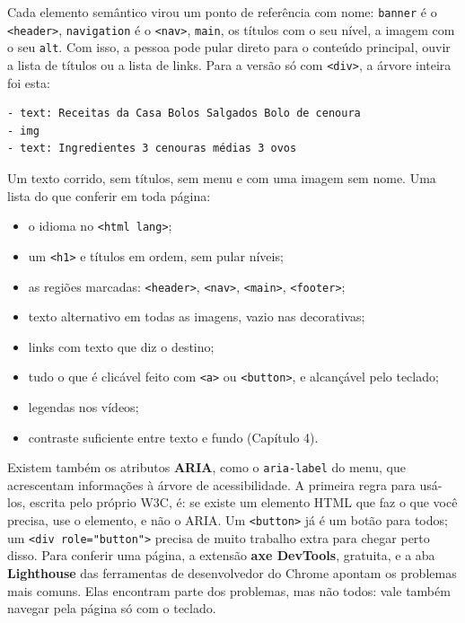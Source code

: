 Cada elemento semântico virou um ponto de referência com nome: \texttt{banner} é o \texttt{<header>}, \texttt{navigation} é o \texttt{<nav>}, \texttt{main}, os títulos com o seu nível, a imagem com o seu \texttt{alt}. Com isso, a pessoa pode pular direto para o conteúdo principal, ouvir a lista de títulos ou a lista de links. Para a versão só com \texttt{<div>}, a árvore inteira foi esta:

\begin{codigo}
\begin{Verbatim}[breaklines=true, breaksymbolleft={}, fontsize=\footnotesize]
- text: Receitas da Casa Bolos Salgados Bolo de cenoura
- img
- text: Ingredientes 3 cenouras médias 3 ovos
\end{Verbatim}
\end{codigo}

Um texto corrido, sem títulos, sem menu e com uma imagem sem nome. Uma lista do que conferir em toda página:

\begin{itemize}
  \item o idioma no \texttt{<html lang>};
  \item um \texttt{<h1>} e títulos em ordem, sem pular níveis;
  \item as regiões marcadas: \texttt{<header>}, \texttt{<nav>}, \texttt{<main>}, \texttt{<footer>};
  \item texto alternativo em todas as imagens, vazio nas decorativas;
  \item links com texto que diz o destino;
  \item tudo o que é clicável feito com \texttt{<a>} ou \texttt{<button>}, e alcançável pelo teclado;
  \item legendas nos vídeos;
  \item contraste suficiente entre texto e fundo (Capítulo 4).
\end{itemize}

Existem também os atributos \textbf{ARIA}, como o \texttt{aria-label} do menu, que acrescentam informações à árvore de acessibilidade. A primeira regra para usá-los, escrita pelo próprio W3C, é: se existe um elemento HTML que faz o que você precisa, use o elemento, e não o ARIA. Um \texttt{<button>} já é um botão para todos; um \texttt{<div role="button">} precisa de muito trabalho extra para chegar perto disso. Para conferir uma página, a extensão \textbf{axe DevTools}, gratuita, e a aba \textbf{Lighthouse} das ferramentas de desenvolvedor do Chrome apontam os problemas mais comuns. Elas encontram parte dos problemas, mas não todos: vale também navegar pela página só com o teclado.

